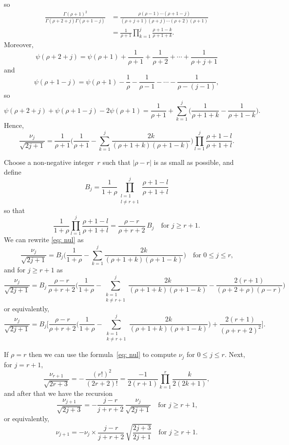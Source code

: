\documentclass[12pt,a4paper]{article}
\begin{document}
so
\begin{align*}
\frac{\Gamma(\rho+1)^2}{\Gamma(\rho+2+j)\Gamma(\rho+1-j)}
	&=\frac{\rho(\rho-1)\cdots(\rho+1-j)}%
{(\rho+j+1)(\rho+j)\cdots(\rho+2)(\rho+1)}\\
	&=\frac{1}{\rho+1}\prod_{k=1}^j\frac{\rho+1-k}{\rho+1+k}.
\end{align*}
Moreover,
\[
\psi(\rho+2+j)=\psi(\rho+1)+\frac{1}{\rho+1}+\frac{1}{\rho+2}
	+\cdots+\frac{1}{\rho+j+1}
\]
and
\[
\psi(\rho+1-j)=\psi(\rho+1)-\frac{1}{\rho}-\frac{1}{\rho-1}
	-\cdots-\frac{1}{\rho-(j-1)},
\]
so
\[
\psi(\rho+2+j)+\psi(\rho+1-j)-2\psi(\rho+1)
	=\frac{1}{\rho+1}+\sum_{k=1}^j\biggl(\frac{1}{\rho+1+k}
		-\frac{1}{\rho+1-k}\biggr).
\]
Hence,
\begin{equation}\label{eq: nul}
\frac{\nu_j}{\sqrt{2j+1}}=\frac{1}{\rho+1}\biggl(\frac{1}{\rho+1}
	-\sum_{k=1}^j\frac{2k}{(\rho+1+k)(\rho+1-k)}\biggr)
	\prod_{l=1}^j\frac{\rho+1-l}{\rho+1+l}.
\end{equation}

Choose a non-negative integer~$r$ such that $|\rho-r|$ is as small as 
possible, and define
\[
B_j=\frac{1}{1+\rho}\prod_{\substack{l=1\\ l\ne r+1}}^j\frac{\rho+1-l}{\rho+1+l}
\]
so that
\[
\frac{1}{1+\rho}\prod_{l=1}^j\frac{\rho+1-l}{\rho+1+l}
	=\frac{\rho-r}{\rho+r+2}\,B_j\quad\text{for $j\ge r+1$.}
\]
We can rewrite \eqref{eq: nul} as
\[
\frac{\nu_j}{\sqrt{2j+1}}=B_j\biggl(
	\frac{1}{1+\rho}-\sum_{k=1}^j
	\frac{2k}{(\rho+1+k)(\rho+1-k)}
		\biggr)\quad\text{for $0\le j\le r$,}
\]
and for $j\ge r+1$ as
\[
\frac{\nu_j}{\sqrt{2j+1}}=B_j\,\frac{\rho-r}{\rho+r+2}
	\biggl(\frac{1}{1+\rho}
	-\sum_{\substack{k=1\\ k\ne r+1}}^j
	\frac{2k}{(\rho+1+k)(\rho+1-k)}-\frac{2(r+1)}{(\rho+2+\rho)(\rho-r)}\biggr)
\]
or equivalently,
\[
\frac{\nu_j}{\sqrt{2j+1}}=B_j\biggl[\frac{\rho-r}{\rho+r+2}
	\biggl(\frac{1}{1+\rho}
	-\sum_{\substack{k=1\\ k\ne r+1}}^j
	\frac{2k}{(\rho+1+k)(\rho+1-k)}\biggr)
+\frac{2(r+1)}{(\rho+r+2)^2}\biggr].
\]


If $\rho=r$ then we can use the formula~\eqref{eq: nul} to compute
$\nu_j$ for $0\le j\le r$.  Next, for $j=r+1$,
\[
\frac{\nu_{r+1}}{\sqrt{2r+3}}
	=-\,\frac{(r!)^2}{(2r+2)!}=\frac{-1}{2(r+1) }
	\prod_{k=1}^r\frac{k}{2(2k+1)},
\]
and after that we have the recursion
\[
\frac{\nu_{j+1}}{\sqrt{2j+3}}=-\frac{j-r}{j+r+2}\,
	\frac{\nu_j}{\sqrt{2j+1}}
	\quad\text{for $j\ge r+1$,}
\]
or equivalently,
\[
\nu_{j+1}=-\nu_j\times\frac{j-r}{j+r+2}\,\sqrt{\frac{2j+3}{2j+1}}
	\quad\text{for $j\ge r+1$.}
\]
\end{document}
